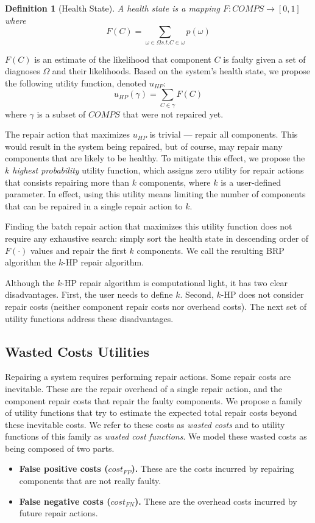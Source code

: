 \documentclass[a4paper,11pt]{report}
\newtheorem{definition}{Definition}
\begin{document}
\begin{definition}[Health State]
A health state is a mapping $F: COMPS\rightarrow [0,1]$ where
\[ \displaystyle F(C)=\sum_{\omega\in \Omega s.t. C\in \omega} p(\omega)\]
\label{def:health-state}
\end{definition}
$F(C)$ is an estimate of the likelihood that component $C$ is faulty given a set of diagnoses $\Omega$ and their likelihoods.
Based on the system's health state, we propose the following utility function, denoted $u_{HP}$:
\[
u_{HP}(\gamma) = \sum_{C\in \gamma} F(C)
\]
where $\gamma$ is a subset of $COMPS$ that were not repaired yet.


The repair action that maximizes $u_{HP}$ is trivial --- repair all components.
This would result in the system being repaired, but of course, may repair many components that are likely to be healthy. To mitigate this effect, we propose the {\em $k$ highest probability} utility function, 
which assigns zero utility for repair actions
that consists repairing more than $k$ components, where $k$ is a user-defined parameter. 
In effect, using this utility means limiting the number of components that can be repaired in a single repair action to $k$. 

Finding the batch repair action that maximizes this utility function does not require any exhaustive search: simply sort the health state in descending order of $F(\cdot)$ values and repair the first $k$ components. We call the resulting BRP algorithm the $k$-HP repair algorithm. 


Although the $k$-HP repair algorithm is computational light, it has two clear disadvantages. First, the user needs to define $k$. Second, $k$-HP does not consider repair costs (neither component repair costs nor overhead costs).
The next set of utility functions address these disadvantages.



\subsection{Wasted Costs Utilities}

Repairing a system requires performing repair actions.
Some repair costs are inevitable. These are the repair overhead of a single repair action, and the component repair costs that repair the faulty components. We propose a family of utility functions that try to estimate the expected total repair costs beyond these inevitable costs. We refer to these costs as {\em wasted costs} and to utility functions of this family as {\em wasted cost functions}. We model these wasted costs as being composed of two parts.
\begin{itemize}
\item {\bf False positive costs ($cost_{FP}$).} These are the costs incurred by repairing components that are not really faulty.
\item {\bf False negative costs ($cost_{FN}$).} These are the overhead costs incurred by future repair actions.
\end{itemize}
\end{document}
